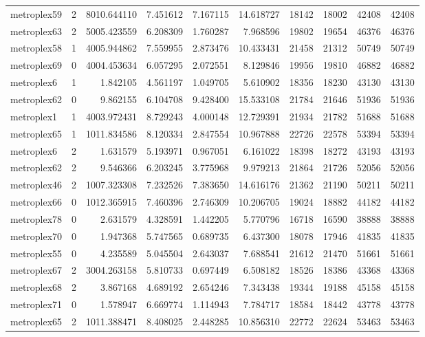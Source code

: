 \begin{longtable}{|l|r|r|r|r|r|r|r|r|r|}
metroplex59 & 2 & 8010.644110 & 7.451612 & 7.167115 & 14.618727 & 18142 & 18002 & 42408 & 42408 \\
metroplex63 & 2 & 5005.423559 & 6.208309 & 1.760287 & 7.968596 & 19802 & 19654 & 46376 & 46376 \\
metroplex58 & 1 & 4005.944862 & 7.559955 & 2.873476 & 10.433431 & 21458 & 21312 & 50749 & 50749 \\
metroplex69 & 0 & 4004.453634 & 6.057295 & 2.072551 & 8.129846 & 19956 & 19810 & 46882 & 46882 \\
metroplex6 & 1 & 1.842105 & 4.561197 & 1.049705 & 5.610902 & 18356 & 18230 & 43130 & 43130 \\
metroplex62 & 0 & 9.862155 & 6.104708 & 9.428400 & 15.533108 & 21784 & 21646 & 51936 & 51936 \\
metroplex1 & 1 & 4003.972431 & 8.729243 & 4.000148 & 12.729391 & 21934 & 21782 & 51688 & 51688 \\
metroplex65 & 1 & 1011.834586 & 8.120334 & 2.847554 & 10.967888 & 22726 & 22578 & 53394 & 53394 \\
metroplex6 & 2 & 1.631579 & 5.193971 & 0.967051 & 6.161022 & 18398 & 18272 & 43193 & 43193 \\
metroplex62 & 2 & 9.546366 & 6.203245 & 3.775968 & 9.979213 & 21864 & 21726 & 52056 & 52056 \\
metroplex46 & 2 & 1007.323308 & 7.232526 & 7.383650 & 14.616176 & 21362 & 21190 & 50211 & 50211 \\
metroplex66 & 0 & 1012.365915 & 7.460396 & 2.746309 & 10.206705 & 19024 & 18882 & 44182 & 44182 \\
metroplex78 & 0 & 2.631579 & 4.328591 & 1.442205 & 5.770796 & 16718 & 16590 & 38888 & 38888 \\
metroplex70 & 0 & 1.947368 & 5.747565 & 0.689735 & 6.437300 & 18078 & 17946 & 41835 & 41835 \\
metroplex55 & 0 & 4.235589 & 5.045504 & 2.643037 & 7.688541 & 21612 & 21470 & 51661 & 51661 \\
metroplex67 & 2 & 3004.263158 & 5.810733 & 0.697449 & 6.508182 & 18526 & 18386 & 43368 & 43368 \\
metroplex68 & 2 & 3.867168 & 4.689192 & 2.654246 & 7.343438 & 19344 & 19188 & 45158 & 45158 \\
metroplex71 & 0 & 1.578947 & 6.669774 & 1.114943 & 7.784717 & 18584 & 18442 & 43778 & 43778 \\
metroplex65 & 2 & 1011.388471 & 8.408025 & 2.448285 & 10.856310 & 22772 & 22624 & 53463 & 53463 \\

\end{longtable}
